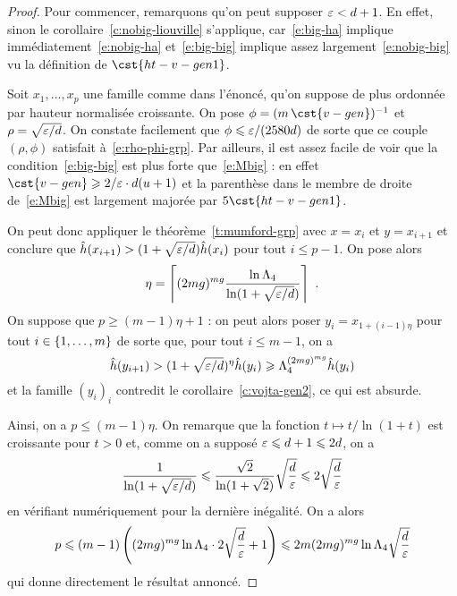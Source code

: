 \begin{proof}
  Pour commencer, remarquons qu'on peut supposer \( \varepsilon < d + 1 \). En
  effet, sinon le corollaire~\vref{c:nobig-liouville} s'applique,
  car~\eqref{e:big-ha} implique immédiatement~\eqref{e:nobig-ha}
  et~\eqref{e:big-big} implique assez largement~\eqref{e:nobig-big} vu la
  définition de \( \cst{ht-v-gen1} \).

  Soit \( x_1, \dots, x_p \) une famille comme dans l'énoncé, qu'on suppose de
  plus ordonnée par hauteur normalisée croissante. On pose
  \( \phi =( m \, \cst{v-gen})^{-1} \) et
  \( \rho = \sqrt{ \varepsilon / d } \).  On constate facilement que
  \( \phi \leqslant \varepsilon / (2580 d) \) de sorte que ce couple \( (\rho, \phi) \)
  satisfait à~\eqref{e:rho-phi-grp}. Par ailleurs, il est assez facile de voir
  que la condition~\eqref{e:big-big} est plus forte que~\eqref{e:Mbig} : en
  effet \( \cst{v-gen} \ge 2/\eps \cdot \adeg (\adim+1) \) et la parenthèse
  dans le membre de droite de~\eqref{e:Mbig} est largement majorée par \( 5
    \cst{ht-v-gen1} \).

  On peut donc appliquer le théorème~\vref{t:mumford-grp} avec \( x = x_i \)
  et \( y = x_{i+1} \) et conclure que
  \( \hat h ( x_{i+1} ) > (1 + \sqrt{\varepsilon / d}) \hat h ( x_i ) \) pour tout
  \( i \le p-1 \). On pose alors
  \begin{equation}
    \eta
    =
    \left\lceil
      (2mg)^{mg}
      \frac{ \ln \Lambda_4 }{ \ln (1 + \sqrt{\varepsilon / d}) }
    \right\rceil
    \text{ .}
  \end{equation}
  On suppose que \( p \ge (m-1) \eta + 1 \) : on peut alors poser
  \( y_i = x_{1 + (i-1) \eta} \) pour tout \( i \in \lbrace1, \dots, m\rbrace \) de
  sorte que, pour tout \( i \le m-1 \), on a
  \begin{equation}
    \hat h ( y_{i+1} )
    >
    (1 + \sqrt{\varepsilon / d})^\eta
    \hat h ( y_i )
    \geqslant
    \Lambda_4^{(2mg)^{mg}}
    \hat h ( y_i )
  \end{equation}
  et la famille \( (y_i)_i \) contredit le corollaire~\vref{c:vojta-gen2}, ce
  qui est absurde.

  Ainsi, on a \( p \le (m-1) \eta \). On remarque que la fonction \( t
    \mapsto t / \ln(1+t) \) est croissante pour \( t > 0 \) et, comme on a
  supposé \( \varepsilon \leqslant d+1 \leqslant 2d \), on a
  \begin{equation}
    \frac1{ \ln(1 + \sqrt{\varepsilon/d}) }
    \leqslant
    \frac{ \sqrt2 }{ \ln(1 + \sqrt2) }
    \sqrt{ \frac d {\varepsilon} }
    \leqslant
    2 \sqrt{ \frac d {\varepsilon} }
  \end{equation}
  en vérifiant numériquement pour la dernière inégalité. On a alors
  \begin{equation}
    p
    \leqslant
    (m - 1)
    \left(
      (2mg)^{mg} \ln \Lambda_4
      \cdot 2 \sqrt{ \frac d {\varepsilon} }
      + 1
    \right)
    \leqslant
    2 m
    (2mg)^{mg} \ln \Lambda_4
    \sqrt{ \frac d {\varepsilon} }
  \end{equation}
  qui donne directement le résultat annoncé.
\end{proof}

